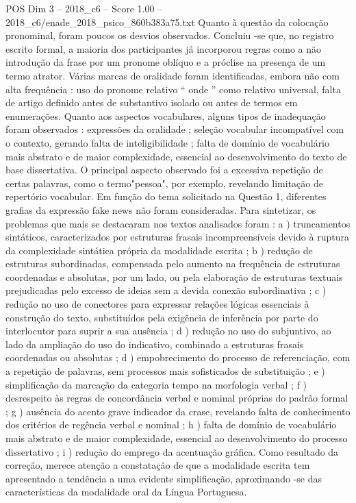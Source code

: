 \begin{textsample}{POS Dim 3 – 2018\_c6 – Score 1.00 – 2018\_c6/enade\_2018\_psico\_860b383a75.txt}
Quanto à questão da colocação pronominal, foram poucos os desvios observados.
Concluiu -se que, no registro escrito formal, a maioria dos participantes já incorporou regras como a não introdução da frase por um pronome oblíquo e a próclise na presença de um termo atrator.
Várias marcas de oralidade foram identificadas, embora não com alta frequência : uso do pronome relativo “ onde ” como relativo universal, falta de artigo definido antes de substantivo isolado ou antes de termos em enumerações.
Quanto aos aspectos vocabulares, alguns tipos de inadequação foram observados : expressões da oralidade ; seleção vocabular incompatível com o contexto, gerando falta de inteligibilidade ; falta de domínio de vocabulário mais abstrato e de maior complexidade, essencial ao desenvolvimento do texto de base dissertativa.
O principal aspecto observado foi a excessiva repetição de certas palavras, como o termo"pessoa", por exemplo, revelando limitação de repertório vocabular.
Em função do tema solicitado na Questão 1, diferentes grafias da expressão fake news não foram consideradas.
Para sintetizar, os problemas que mais se destacaram nos textos analisados foram : a ) truncamentos sintáticos, caracterizados por estruturas frasais incompreensíveis devido à ruptura da complexidade sintática própria da modalidade escrita ; b ) redução de estruturas subordinadas, compensada pelo aumento na frequência de estruturas coordenadas e absolutas, por um lado, ou pela elaboração de estruturas textuais prejudicadas pelo excesso de ideias sem a devida conexão subordinativa ; c ) redução no uso de conectores para expressar relações lógicas essenciais à construção do texto, substituídos pela exigência de inferência por parte do interlocutor para suprir a sua ausência ; d ) redução no uso do subjuntivo, ao lado da ampliação do uso do indicativo, combinado a estruturas frasais coordenadas ou absolutas ; d ) empobrecimento do processo de referenciação, com a repetição de palavras, sem processos mais sofisticados de substituição ; e ) simplificação da marcação da categoria tempo na morfologia verbal ; f ) desrespeito às regras de concordância verbal e nominal próprias do padrão formal ; g ) ausência do acento grave indicador da crase, revelando falta de conhecimento dos critérios de regência verbal e nominal ; h ) falta de domínio de vocabulário mais abstrato e de maior complexidade, essencial ao desenvolvimento do processo dissertativo ; i ) redução do emprego da acentuação gráfica.
Como resultado da correção, merece atenção a constatação de que a modalidade escrita tem apresentado a tendência a uma evidente simplificação, aproximando -se das características da modalidade oral da Língua Portuguesa.

\end{textsample}
